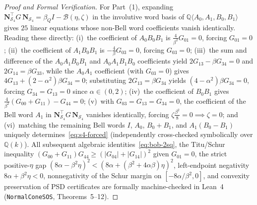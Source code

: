 \documentclass[11pt,a4paper]{article}
\newcommand{\QQ}{\mathbb{Q}}
\newcommand{\calB}{\mathcal{B}}
\newcommand{\calS}{\mathcal{S}}
\begin{document}
\begin{proof}[Proof and Formal Verification]
For Part~(1), expanding $\mathbf{N}_{\calS_4}^\top G\,\mathbf{N}_{\calS_4} = \beta_Q I - \calB(\eta,\zeta)$ in the involutive word basis of $\QQ\langle A_0, A_1, B_0, B_1\rangle$ gives $25$ linear equations whose non-Bell word coefficients vanish identically. Reading these directly:
(i)~the coefficient of $A_0 B_0 B_1$ is $\frac{4}{\beta^2} G_{01} = 0$, forcing $G_{01} = 0$;
(ii)~the coefficient of $A_1 B_0 B_1$ is $-\frac{4}{\beta} G_{03} = 0$, forcing $G_{03} = 0$;
(iii)~the sum and difference of the $A_0 A_1 B_0 B_1$ and $A_0 A_1 B_1 B_0$ coefficients yield $2G_{13} - \beta G_{34} = 0$ and $2G_{14} = \beta G_{33}$, while the $A_0 A_1$ coefficient (with $G_{03}=0$) gives $4G_{13} + (2-\alpha^2)\beta G_{34} = 0$; substituting $2G_{13} = \beta G_{34}$ yields $(4-\alpha^2)\beta G_{34} = 0$, forcing $G_{34} = G_{13} = 0$ since $\alpha \in (0,2)$;
(iv)~the coefficient of $B_0 B_1$ gives $\frac{4}{\beta^2}(G_{00}+G_{11}) - G_{44} = 0$;
(v)~with $G_{03} = G_{13} = G_{34} = 0$, the coefficient of the Bell word $A_1$ in $\mathbf{N}_{\calS_4}^\top G\,\mathbf{N}_{\calS_4}$ vanishes identically, forcing $\zeta \frac{\beta^2}{8} = 0 \implies \zeta = 0$;
and (vi)~matching the remaining Bell words $I$, $A_0$, $B_0+B_1$, and $A_1(B_0-B_1)$ uniquely determines~\eqref{eq:s4-forced} (independently cross-checked symbolically over $\QQ(k)$).
All subsequent algebraic identities~\eqref{eq:bob-2sq}, the Titu/Schur inequality $(G_{00}+G_{11})G_{44} \ge (|G_{04}|+|G_{14}|)^2$ given $G_{01}=0$, the strict positive-$\eta$ gap $(8\alpha - \beta^2 \eta)^2 < (8\alpha + (\beta^2 + 4\alpha\beta)\eta)^2$, left-endpoint negativity $8\alpha + \beta^2 \eta < 0$, nonnegativity of the Schur margin on $[-8\alpha/\beta^2, 0]$, and convexity preservation of PSD certificates are formally machine-checked in Lean~4 (\texttt{NormalConeSOS}, Theorems~5--12).


\end{proof}
\end{document}
